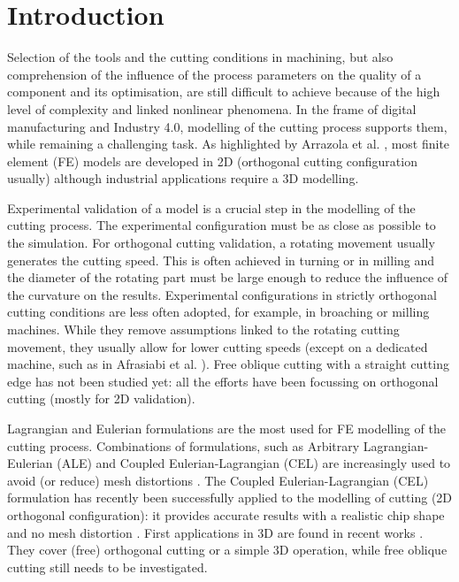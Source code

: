 \documentclass[preprint,12pt,times]{elsarticle}
\begin{document}
\section{Introduction}
\label{Intro}

Selection of the tools and the cutting conditions in machining, but also comprehension of the influence of the process parameters on the quality of a component and its optimisation, are still difficult to achieve because of the high level of complexity and linked nonlinear phenomena. In the frame of digital manufacturing and Industry 4.0, modelling of the cutting process supports them, while remaining a challenging task. As highlighted by Arrazola et al. \cite{arrazola_Recent_2013}, most finite element (FE) models are developed in 2D (orthogonal cutting configuration usually) although industrial applications require a 3D modelling.

Experimental validation of a model is a crucial step in the modelling of the cutting process. The experimental configuration must be as close as possible to the simulation. For orthogonal cutting validation, a rotating movement usually generates the cutting speed. This is often achieved in turning \cite{agmell_Development_2018} or in milling \cite{xu_Simulation_2021} and the diameter of the rotating part must be large enough to reduce the influence of the curvature on the results. Experimental configurations in strictly orthogonal cutting conditions are less often adopted, for example, in broaching \cite{abouridouane_Friction_2021} or milling \cite{ducobu_Experimental_2015, sela_Measurement_2021} machines. While they remove assumptions linked to the rotating cutting movement, they usually allow for lower cutting speeds (except on a dedicated machine, such as in Afrasiabi et al. \cite{afrasiabi_NumericalExperimental_2021}). Free oblique cutting with a straight cutting edge has not been studied yet: all the efforts have been focussing on orthogonal cutting (mostly for 2D validation).

Lagrangian and Eulerian formulations are the most used for FE modelling of the cutting process. Combinations of formulations, such as Arbitrary Lagrangian-Eulerian (ALE) and Coupled Eulerian-Lagrangian (CEL) are increasingly used to avoid (or reduce) mesh distortions \cite{ducobu_Application_2016}. The Coupled Eulerian-Lagrangian (CEL) formulation has recently been successfully applied to the modelling of cutting (2D orthogonal configuration): it provides accurate results with a realistic chip shape and no mesh distortion \cite{ducobu_Application_2016}. First applications in 3D are found in recent works \cite{xu_Simulation_2021, ducobu_Finite_2017, ambrosio_New_2022, vovk_Finite_2020, hardt_Three_2021}. They cover (free) orthogonal cutting or a simple 3D operation, while free oblique cutting still needs to be investigated.
\end{document}
